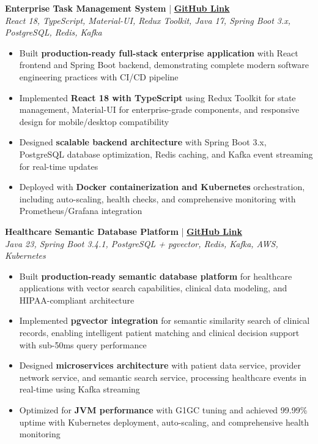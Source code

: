 \documentclass[a4paper,10pt]{article}
\begin{document}
\textbf{Enterprise Task Management System} | \href{https://github.com/shibam-max/enterprise-task-management}{\textbf{GitHub Link}} \\
\textit{React 18, TypeScript, Material-UI, Redux Toolkit, Java 17, Spring Boot 3.x, PostgreSQL, Redis, Kafka}
\begin{itemize}
    \item Built \textbf{production-ready full-stack enterprise application} with React frontend and Spring Boot backend, demonstrating complete modern software engineering practices with CI/CD pipeline
    \item Implemented \textbf{React 18 with TypeScript} using Redux Toolkit for state management, Material-UI for enterprise-grade components, and responsive design for mobile/desktop compatibility
    \item Designed \textbf{scalable backend architecture} with Spring Boot 3.x, PostgreSQL database optimization, Redis caching, and Kafka event streaming for real-time updates
    \item Deployed with \textbf{Docker containerization and Kubernetes} orchestration, including auto-scaling, health checks, and comprehensive monitoring with Prometheus/Grafana integration
\end{itemize}

\textbf{Healthcare Semantic Database Platform} | \href{https://github.com/shibam-max/healthcare-database-platform}{\textbf{GitHub Link}} \\
\textit{Java 23, Spring Boot 3.4.1, PostgreSQL + pgvector, Redis, Kafka, AWS, Kubernetes}
\begin{itemize}
    \item Built \textbf{production-ready semantic database platform} for healthcare applications with vector search capabilities, clinical data modeling, and HIPAA-compliant architecture
    \item Implemented \textbf{pgvector integration} for semantic similarity search of clinical records, enabling intelligent patient matching and clinical decision support with sub-50ms query performance
    \item Designed \textbf{microservices architecture} with patient data service, provider network service, and semantic search service, processing healthcare events in real-time using Kafka streaming
    \item Optimized for \textbf{JVM performance} with G1GC tuning and achieved 99.99\% uptime with Kubernetes deployment, auto-scaling, and comprehensive health monitoring
\end{itemize}
\end{document}
